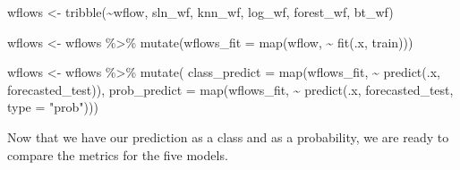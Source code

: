 \documentclass[
]{article}
\newenvironment{Shaded}{\begin{snugshade}}{\end{snugshade}}
\newcommand{\AttributeTok}[1]{\textcolor[rgb]{0.77,0.63,0.00}{#1}}
\newcommand{\FunctionTok}[1]{\textcolor[rgb]{0.00,0.00,0.00}{#1}}
\newcommand{\NormalTok}[1]{#1}
\newcommand{\OtherTok}[1]{\textcolor[rgb]{0.56,0.35,0.01}{#1}}
\newcommand{\SpecialCharTok}[1]{\textcolor[rgb]{0.00,0.00,0.00}{#1}}
\newcommand{\StringTok}[1]{\textcolor[rgb]{0.31,0.60,0.02}{#1}}
\begin{document}
\begin{Shaded}
\begin{Highlighting}[]
\NormalTok{wflows }\OtherTok{\textless{}{-}} \FunctionTok{tribble}\NormalTok{(}\SpecialCharTok{\textasciitilde{}}\NormalTok{wflow,}
\NormalTok{                  sln\_wf,}
\NormalTok{                  knn\_wf, log\_wf, forest\_wf, bt\_wf)}
 


\NormalTok{wflows }\OtherTok{\textless{}{-}}
\NormalTok{  wflows }\SpecialCharTok{\%\textgreater{}\%}
  \FunctionTok{mutate}\NormalTok{(}\AttributeTok{wflows\_fit =} \FunctionTok{map}\NormalTok{(wflow, }\SpecialCharTok{\textasciitilde{}} \FunctionTok{fit}\NormalTok{(.x, train))) }
\end{Highlighting}
\end{Shaded}

\begin{Shaded}
\begin{Highlighting}[]
\NormalTok{wflows }\OtherTok{\textless{}{-}}
\NormalTok{  wflows }\SpecialCharTok{\%\textgreater{}\%}
  \FunctionTok{mutate}\NormalTok{(}
    \AttributeTok{class\_predict =} \FunctionTok{map}\NormalTok{(wflows\_fit, }\SpecialCharTok{\textasciitilde{}} \FunctionTok{predict}\NormalTok{(.x, forecasted\_test)),  }
    \AttributeTok{prob\_predict =} \FunctionTok{map}\NormalTok{(wflows\_fit, }\SpecialCharTok{\textasciitilde{}} \FunctionTok{predict}\NormalTok{(.x, forecasted\_test, }\AttributeTok{type =} \StringTok{"prob"}\NormalTok{)))}
\end{Highlighting}
\end{Shaded}

Now that we have our prediction as a class and as a probability, we are
ready to compare the metrics for the five models.
\end{document}
